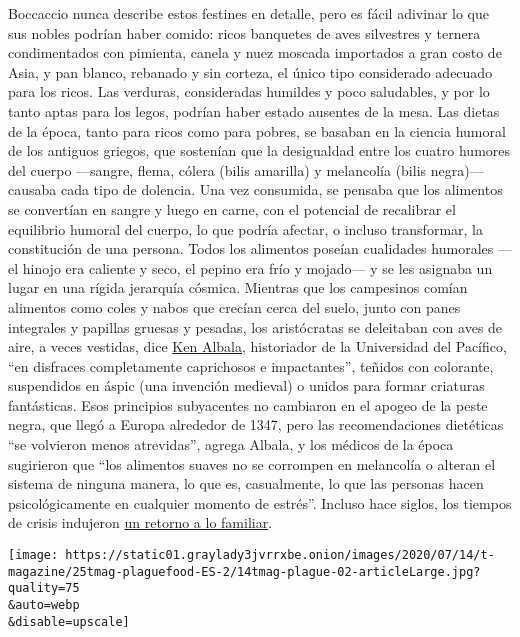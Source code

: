 Boccaccio nunca describe estos festines en detalle, pero es fácil
adivinar lo que sus nobles podrían haber comido: ricos banquetes de aves
silvestres y ternera condimentados con pimienta, canela y nuez moscada
importados a gran costo de Asia, y pan blanco, rebanado y sin corteza,
el único tipo considerado adecuado para los ricos. Las verduras,
consideradas humildes y poco saludables, y por lo tanto aptas para los
legos, podrían haber estado ausentes de la mesa. Las dietas de la época,
tanto para ricos como para pobres, se basaban en la ciencia humoral de
los antiguos griegos, que sostenían que la desigualdad entre los cuatro
humores del cuerpo ---sangre, flema, cólera (bilis amarilla) y
melancolía (bilis negra)--- causaba cada tipo de dolencia. Una vez
consumida, se pensaba que los alimentos se convertían en sangre y luego
en carne, con el potencial de recalibrar el equilibrio humoral del
cuerpo, lo que podría afectar, o incluso transformar, la constitución de
una persona. Todos los alimentos poseían cualidades humorales ---el
hinojo era caliente y seco, el pepino era frío y mojado--- y se les
asignaba un lugar en una rígida jerarquía cósmica. Mientras que los
campesinos comían alimentos como coles y nabos que crecían cerca del
suelo, junto con panes integrales y papillas gruesas y pesadas, los
aristócratas se deleitaban con aves de aire, a veces vestidas, dice
\href{https://www.pacific.edu/academics/schools-and-colleges/college-of-the-pacific/academics/departments-and-programs/history/faculty-directory/ken-albala.html}{Ken
Albala}, historiador de la Universidad del Pacífico, ``en disfraces
completamente caprichosos e impactantes'', teñidos con colorante,
suspendidos en áspic (una invención medieval) o unidos para formar
criaturas fantásticas. Esos principios subyacentes no cambiaron en el
apogeo de la peste negra, que llegó a Europa alrededor de 1347, pero las
recomendaciones dietéticas ``se volvieron menos atrevidas'', agrega
Albala, y los médicos de la época sugirieron que ``los alimentos suaves
no se corrompen en melancolía o alteran el sistema de ninguna manera, lo
que es, casualmente, lo que las personas hacen psicológicamente en
cualquier momento de estrés''. Incluso hace siglos, los tiempos de
crisis indujeron
\href{https://www.nytimes3xbfgragh.onion/2020/04/07/business/coronavirus-processed-foods.html}{un
retorno a lo familiar}.

\texttt{[image: https://static01.graylady3jvrrxbe.onion/images/2020/07/14/t-magazine/25tmag-plaguefood-ES-2/14tmag-plague-02-articleLarge.jpg?quality=75\\\&auto=webp\\\&disable=upscale]}

